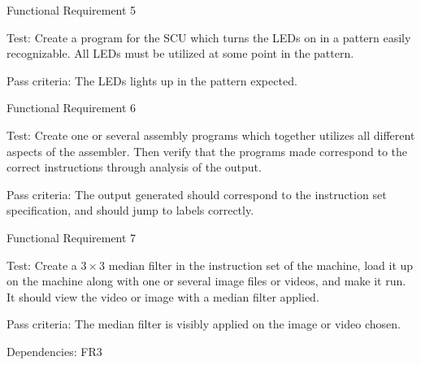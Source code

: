{\sc Functional Requirement 5}
\begin{Test}
  {\em \FRV}
  
  {\sc Test:} Create a program for the \ac{SCU} which turns the \acp{LED} on in
  a pattern easily recognizable. All \acp{LED} must be utilized at some point
  in the pattern.

  {\sc Pass criteria:} The LEDs lights up in the pattern expected.
\end{Test}

\newpage %
{\sc Functional Requirement 6}
\begin{Test}
  {\em \FRVI}
  
  {\sc Test:} Create one or several assembly programs which together utilizes
  all different aspects of the assembler. Then verify that the programs made
  correspond to the correct instructions through analysis of the output.

  {\sc Pass criteria:} The output generated should correspond to the instruction
  set specification, and should jump to labels correctly.
\end{Test}

{\sc Functional Requirement 7}
\begin{Test}
  {\em \FRVII}
  
  {\sc Test:} Create a $3\times3$ median filter in the instruction set of the
  machine, load it up on the machine along with one or several image files or
  videos, and make it run. It should view the video or image with a median
  filter applied.

  {\sc Pass criteria:} The median filter is visibly applied on the image or
  video chosen.

  {\sc Dependencies:} FR3
\end{Test}

